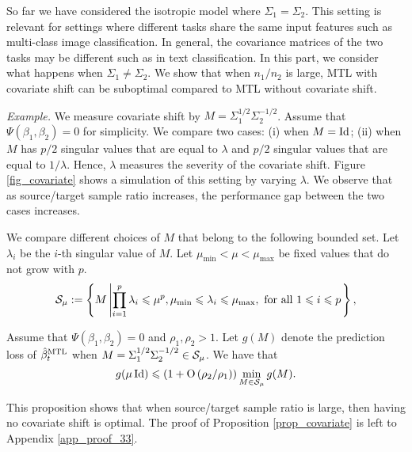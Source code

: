 So far we have considered the isotropic model where $\Sigma_1 = \Sigma_2$.
This setting is relevant for settings where different tasks share the same input features such as multi-class image classification.
In general, the covariance matrices of the two tasks may be different such as in text classification.
In this part, we consider what happens when $\Sigma_1 \neq \Sigma_2$.
We show that when $n_1 / n_2$ is large, MTL with covariate shift can be suboptimal compared to MTL without covariate shift.

\textit{Example.}
	We measure covariate shift by $M = \Sigma_1^{1/2} \Sigma_2^{-1/2}$.
	Assume that $\Psi(\beta_1, \beta_2) = 0$ for simplicity.
	We compare two cases: (i) when $M = \operatorname{Id}$; (ii) when $M$ has $p/2$ singular values that are equal to $\lambda$ and $p/2$ singular values that are equal to $1 / \lambda$.
	Hence, $\lambda$ measures the severity of the covariate shift.
	Figure \ref{fig_covariate} shows a simulation of this setting by varying $\lambda$.
	We observe that as source/target sample ratio increases, the performance gap between the two cases increases.

We compare different choices of $M$ that belong to the following bounded set.
Let $\lambda_i$ be the $i$-th singular value of $M$.
Let $\mu_{\min} < \mu < \mu_{\max}$ be fixed values that do not grow with $p$.
\vspace{-0.025in}
{\small\begin{align*}
		\mathcal{S}_{\mu}:=\left\{ M \left| \prod_{i=1}^p \lambda_i \leqslant \mu^p, \mu_{\min} \leqslant \lambda_i\leqslant \mu_{\max}, \text{ for all } 1\leqslant i\leqslant p\right. \right\},
\end{align*}}
\begin{proposition}\label{prop_covariate}
	Assume that $\Psi(\beta_1, \beta_2) = 0$ and $\rho_1, \rho_2>1$.
	Let $g(M)$ denote the prediction loss of $\hat{\beta}_t^{\text{MTL}}$ when $M = \Sigma_1^{1/2}\Sigma_2^{-1/2} \in\mathcal{S}_{\mu}$.
	We have that
	{\small\[ g(\mu\operatorname{Id}) \leqslant \left({1+ \operatorname{O}\left({\rho_2}/{\rho_1}  \right)}\right) \min_{M\in\mathcal{S}_{\mu}} g(M). \]}
\end{proposition}
This proposition shows that when source/target sample ratio is large, then having no covariate shift is optimal.
The proof of Proposition \ref{prop_covariate} is left to Appendix \ref{app_proof_33}.

